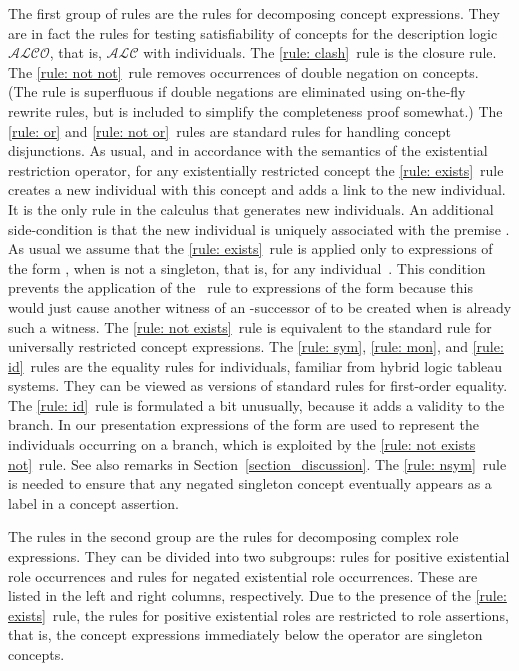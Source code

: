\documentclass[leqno
,pdflatex
,prodmode
,acmtocl
]{acmsmall}
\newcommand{\mathcmd}[1]{\ensuremath{#1}\xspace}
\newcommand{\dlfont}{\mathcal}
\newcommand{\dl}[1]{\mathcmd{\dlfont{#1}}}
\newcommand{\ALC}{\dl{ALC}}
\newcommand{\ALCO}{\dl{ALCO}}
\begin{document}
The first group of rules are the rules for decomposing concept expressions. 
They are in fact the rules for testing satisfiability of concepts
for the description logic \ALCO, that is, \ALC with individuals.
The \eqref{rule: clash}~rule is the closure rule.
The \eqref{rule: not not}~rule removes occurrences of double negation on concepts. 
(The rule is superfluous if double negations are eliminated using
on-the-fly rewrite rules, but is included to 
simplify the completeness proof somewhat.)
The \eqref{rule: or} and \eqref{rule: not or}~rules are
standard rules for handling concept disjunctions.
As usual, and in accordance with the semantics of the existential
restriction operator, for any existentially restricted concept the
\eqref{rule: exists}~rule creates a new individual with this concept and
adds a link to the new individual.
It is the only rule in the calculus that generates new individuals.
An additional side-condition is that the new individual 
is uniquely associated with the premise .
As usual we assume that the \eqref{rule: exists}~rule is applied only to expressions of the form
, when  is not a singleton, that is, 
for any individual~.
This condition prevents the application of the
~rule to expressions of the form 
because this would just cause another witness of an
-successor of  to be created when  is already such a witness.
The \eqref{rule: not exists}~rule is equivalent  to the standard rule for universally restricted concept expressions.
The \eqref{rule: sym}, \eqref{rule: mon}, and \eqref{rule: id}~rules
are the equality rules for individuals,
familiar from hybrid logic tableau systems. They can be viewed
as versions of standard rules for first-order equality.
The \eqref{rule: id}~rule is formulated a bit unusually, because
it adds a validity  to the branch. In our
presentation expressions of the form  are used to
represent the individuals occurring on
a branch, which is exploited by the \eqref{rule: not exists not}~rule. 
See also remarks in Section~\ref{section_discussion}.
The \eqref{rule: nsym}~rule is needed 
to ensure that any negated singleton concept
eventually appears as a label in a concept assertion.

The rules in the second group are the rules for decomposing
complex role expressions.
They can be divided into two subgroups:
rules for positive existential role occurrences and rules for
negated existential role occurrences.
These are listed in the left and right columns, respectively.
Due to the presence of the \eqref{rule: exists}~rule, the rules for positive
existential roles are restricted to role assertions, that is, the
concept expressions immediately below the  operator are
singleton concepts.
\end{document}
